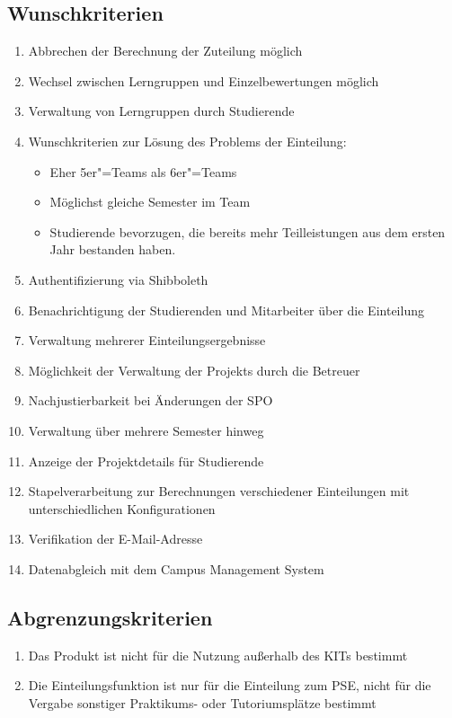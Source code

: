\documentclass[parskip=full]{scrartcl}
\newcommand{\swtLabel}[1]{\textbf{/#1\arabic*0/}}
\begin{document}
\subsection{Wunschkriterien}
\begin{enumerate}[label=\swtLabel{W}]
  \item Abbrechen der Berechnung der Zuteilung möglich 
    \item Wechsel zwischen Lerngruppen und 
    Einzelbewertungen möglich %
    \item Verwaltung von Lerngruppen durch Studierende
    \item Wunschkriterien zur Lösung des Problems der Einteilung:
    \begin{itemize}
        \item Eher 5er"=Teams als 6er"=Teams
        \item Möglichst gleiche Semester im Team
        \item Studierende bevorzugen, die bereits mehr Teilleistungen aus dem
        ersten Jahr bestanden haben.
    \end{itemize}    
    \item Authentifizierung via Shibboleth
    \item Benachrichtigung der Studierenden und Mitarbeiter über die Einteilung
    \item Verwaltung mehrerer Einteilungsergebnisse
    \item Möglichkeit der Verwaltung der \glspl{Projekt} durch die Betreuer  %
    \item Nachjustierbarkeit bei Änderungen der SPO %
    \item Verwaltung über mehrere Semester hinweg
    \item Anzeige der Projektdetails für Studierende
    \item Stapelverarbeitung zur Berechnungen verschiedener Einteilungen mit
    unterschiedlichen Konfigurationen
    \item Verifikation der E-Mail-Adresse
    \item Datenabgleich mit dem Campus Management System %
    
    
    
\end{enumerate}

\subsection{Abgrenzungskriterien}
\begin{enumerate}[label=\swtLabel{A}]
 
  \item Das Produkt ist nicht für die Nutzung außerhalb des KITs bestimmt %

\item Die Einteilungsfunktion ist nur für die Einteilung zum PSE, nicht
für die Vergabe sonstiger Praktikums- oder Tutoriumsplätze bestimmt
  
\end{enumerate}
\end{document}
